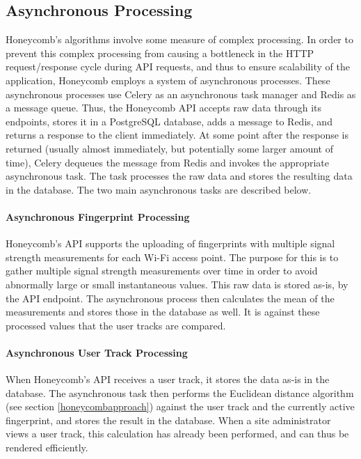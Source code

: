 		
\subsection{Asynchronous Processing}
%


Honeycomb's algorithms involve some measure of complex processing. In order to prevent this complex processing from causing a bottleneck in the HTTP request/response cycle during API requests, and thus to ensure scalability of the application, Honeycomb employs a system of asynchronous processes. These asynchronous processes use Celery \cite{celery} as an asynchronous task manager and Redis \cite{redis} as a message queue. Thus, the Honeycomb API accepts raw data through its endpoints, stores it in a PostgreSQL \cite{postgresql} database, adds a message to Redis, and returns a response to the client immediately. At some point after the response is returned (usually almost immediately, but potentially some larger amount of time), Celery dequeues the message from Redis and invokes the appropriate asynchronous task. The task processes the raw data and stores the resulting data in the database. The two main asynchronous tasks are described below.


\paragraph{Asynchronous Fingerprint Processing}


Honeycomb's API supports the uploading of fingerprints with multiple signal strength measurements for each Wi-Fi access point. The purpose for this is to gather multiple signal strength measurements over time in order to avoid abnormally large or small instantaneous values. This raw data is stored as-is, by the API endpoint. The asynchronous process then calculates the mean of the measurements \cite{turner2011empirical} and stores those in the database as well. It is against these processed values that the user tracks are compared.


\paragraph{Asynchronous User Track Processing}


When Honeycomb's API receives a user track, it stores the data as-is in the database. The asynchronous task then performs the Euclidean distance algorithm (see section \ref{honeycombapproach}) against the user track and the currently active fingerprint, and stores the result in the database. When a site administrator views a user track, this calculation has already been performed, and can thus be rendered efficiently.
	

